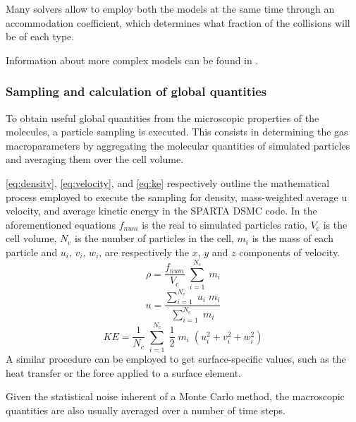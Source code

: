 Many solvers allow to employ both the models at the same time through an accommodation coefficient, which determines what fraction of the collisions will be of each type.

Information about more complex models can be found in \cite{spartadoc}.

\subsubsection{Sampling and calculation of global quantities}
\label{subsection:sampling}

To obtain useful global quantities from the microscopic properties of the molecules, a particle sampling is executed. This consists in determining the gas macroparameters by aggregating the molecular quantities of simulated particles and averaging them over the cell volume. 

\autoref{eq:density}, \autoref{eq:velocity}, and \autoref{eq:ke} respectively outline the mathematical process employed to execute the sampling for density, mass-weighted average u velocity, and average kinetic energy in the SPARTA DSMC code. In the aforementioned equations $f_{num}$ is the real to simulated particles ratio, $V_{\mathrm{c}}$ is the cell volume, $N_{\mathrm{c}}$ is the number of particles in the cell, $m_i$ is the mass of each particle and $u_i$, $v_i$, $w_i$, are respectively the $x$, $y$ and $z$ components of velocity.
\begin{equation}
    \rho = \frac{f_{num}}{V_{\mathrm{c}}}\; \sum_{i=1}^{N_{\mathrm{c}}}\; m_i
    \label{eq:density}
\end{equation}
\begin{equation}
    u = \frac{\sum_{i=1}^{N_{\mathrm{c}}}\; u_i\; m_i}{\sum_{i=1}^{N_{\mathrm{c}}}\; m_i} 
    \label{eq:velocity}
\end{equation}
\begin{equation}
    KE = \frac{1}{N_c}\; \sum_{i=1}^{N_{\mathrm{c}}}\; \frac{1}{2}\; m_i\; (u_i^2+v_i^2+w_i^2)
    \label{eq:ke}
\end{equation}
A similar procedure can be employed to get surface-specific values, such as the heat transfer or the force applied to a surface element.

Given the statistical noise inherent of a Monte Carlo method, the macroscopic quantities are also usually averaged over a number of time steps.

